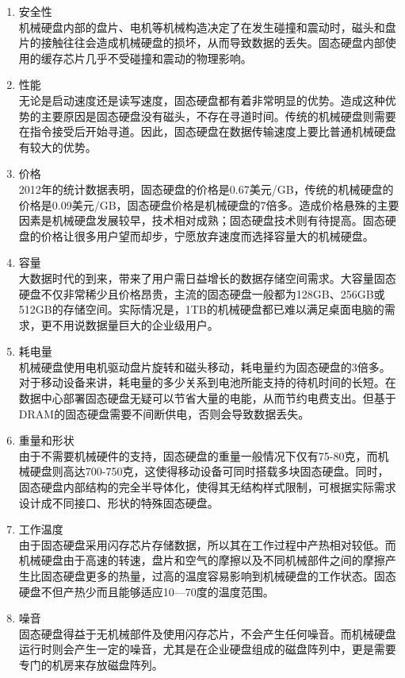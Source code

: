 \begin{enumerate}
\item 安全性
\\机械硬盘内部的盘片、电机等机械构造决定了在发生碰撞和震动时，磁头和盘片的接触往往会造成机械硬盘的损坏，从而导致数据的丢失。固态硬盘内部使用的缓存芯片几乎不受碰撞和震动的物理影响。
\item 性能
\\无论是启动速度还是读写速度，固态硬盘都有着非常明显的优势。造成这种优势的主要原因是固态硬盘没有磁头，不存在寻道时间。传统的机械硬盘则需要在指令接受后开始寻道。因此，固态硬盘在数据传输速度上要比普通机械硬盘有较大的优势。
\item 价格
\\2012年的统计数据表明，固态硬盘的价格是0.67美元/GB，传统的机械硬盘的价格是0.09美元/GB，固态硬盘价格是机械硬盘的7倍多。造成价格悬殊的主要因素是机械硬盘发展较早，技术相对成熟；固态硬盘技术则有待提高。固态硬盘的价格让很多用户望而却步，宁愿放弃速度而选择容量大的机械硬盘。
\item 容量
\\大数据时代的到来，带来了用户需日益增长的数据存储空间需求。大容量固态硬盘不仅非常稀少且价格昂贵，主流的固态硬盘一般都为128GB、256GB或512GB的存储空间。实际情况是，1TB的机械硬盘都已难以满足桌面电脑的需求，更不用说数据量巨大的企业级用户。
\item 耗电量
\\机械硬盘使用电机驱动盘片旋转和磁头移动，耗电量约为固态硬盘的3倍多。对于移动设备来讲，耗电量的多少关系到电池所能支持的待机时间的长短。在数据中心部署固态硬盘无疑可以节省大量的电能，从而节约电费支出。但基于DRAM的固态硬盘需要不间断供电，否则会导致数据丢失。
\item 重量和形状
\\由于不需要机械硬件的支持，固态硬盘的重量一般情况下仅有75-80克，而机械硬盘则高达700-750克，这使得移动设备可同时搭载多块固态硬盘。同时，固态硬盘内部结构的完全半导体化，使得其无结构样式限制，可根据实际需求设计成不同接口、形状的特殊固态硬盘。
\item 工作温度
\\由于固态硬盘采用闪存芯片存储数据，所以其在工作过程中产热相对较低。而机械硬盘由于高速的转速，盘片和空气的摩擦以及不同机械部件之间的摩擦产生比固态硬盘更多的热量，过高的温度容易影响到机械硬盘的工作状态。固态硬盘不但产热少而且能够适应10—70度的温度范围。
\item 噪音
\\ 固态硬盘得益于无机械部件及使用闪存芯片，不会产生任何噪音。而机械硬盘运行时则会产生一定的噪音，尤其是在企业硬盘组成的磁盘阵列中，更是需要专门的机房来存放磁盘阵列。
\end{enumerate}

